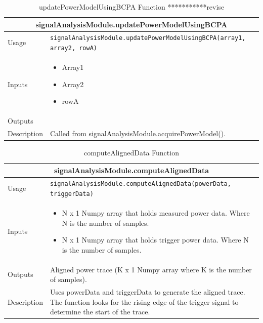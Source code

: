 \documentclass{llncs}
\numberwithin{algorithm}{chapter}
\begin{document}
\begin{table}[H]
\caption{updatePowerModelUsingBCPA Function ***********revise}
\begin{tabular}{ |p{2cm}||p{11cm}|  }
 \hline
 \multicolumn{2}{|c|}{\cellcolor{teal}\textbf{signalAnalysisModule.updatePowerModelUsingBCPA}} \\
 \hline
 Usage & \texttt{signalAnalysisModule.updatePowerModelUsingBCPA(array1, array2, rowA)}\\ \hline
 Inputs & \begin{itemize}
 			\item Array1
 			\item Array2
 			\item rowA
 			\end{itemize}
  \\ \hline
 Outputs & \\ \hline
 Description & Called from signalAnalysisModule.acquirePowerModel().
 \\ \hline
\end{tabular}
\end{table}

\begin{table}[H]
\caption{computeAlignedData Function}
\begin{tabular}{ |p{2cm}||p{11cm}|  }
 \hline
 \multicolumn{2}{|c|}{\cellcolor{teal}\textbf{signalAnalysisModule.computeAlignedData}} \\
 \hline
 Usage & \texttt{signalAnalysisModule.computeAlignedData(powerData, triggerData)}\\ \hline
 Inputs &  \begin{itemize}
 		    \item N x 1 Numpy array that holds measured power data. Where N is the number of samples.
 		    \item N x 1 Numpy array that holds trigger power data. Where N is the number of samples.
 		    \end{itemize} \\ \hline
 Outputs & Aligned power trace (K x 1 Numpy array where K is the number of samples). \\ \hline
 Description & Uses powerData and triggerData to generate the aligned trace.
The function looks for the rising edge of the trigger signal to determine the start of the trace. \\ \hline
\end{tabular}
\end{table}
\end{document}
